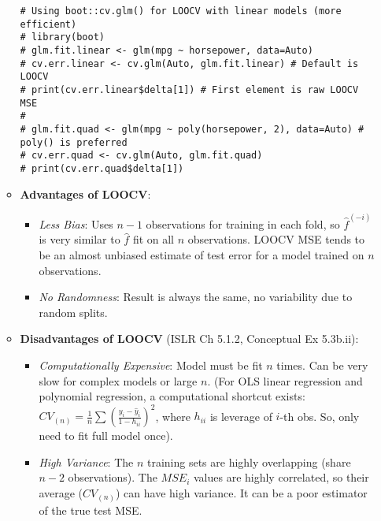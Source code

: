 \documentclass[12pt,a4paper]{article}
\begin{document}
\begin{itemize}
\begin{itemize}
\begin{lstlisting}[caption={LOOCV for Auto Data (Conceptual from Slide L5 p.23)}]
# Using boot::cv.glm() for LOOCV with linear models (more efficient)
# library(boot)
# glm.fit.linear <- glm(mpg ~ horsepower, data=Auto)
# cv.err.linear <- cv.glm(Auto, glm.fit.linear) # Default is LOOCV
# print(cv.err.linear$delta[1]) # First element is raw LOOCV MSE
# 
# glm.fit.quad <- glm(mpg ~ poly(horsepower, 2), data=Auto) # poly() is preferred
# cv.err.quad <- cv.glm(Auto, glm.fit.quad)
# print(cv.err.quad$delta[1])
\end{lstlisting}
            \item \textbf{Advantages of LOOCV}:
                \begin{itemize}
                    \item \textit{Less Bias}: Uses $n-1$ observations for training in each fold, so $\hat{f}^{(-i)}$ is very similar to $\hat{f}$ fit on all $n$ observations. LOOCV MSE tends to be an almost unbiased estimate of test error for a model trained on $n$ observations.
                    \item \textit{No Randomness}: Result is always the same, no variability due to random splits.
                \end{itemize}
            \item \textbf{Disadvantages of LOOCV} (ISLR Ch 5.1.2, Conceptual Ex 5.3b.ii):
                \begin{itemize}
                    \item \textit{Computationally Expensive}: Model must be fit $n$ times. Can be very slow for complex models or large $n$.
                        (For OLS linear regression and polynomial regression, a computational shortcut exists: $CV_{(n)} = \frac{1}{n} \sum (\frac{y_i - \hat{y}_i}{1-h_{ii}})^2$, where $h_{ii}$ is leverage of $i$-th obs. So, only need to fit full model once).
                    \item \textit{High Variance}: The $n$ training sets are highly overlapping (share $n-2$ observations). The $MSE_i$ values are highly correlated, so their average ($CV_{(n)}$) can have high variance. It can be a poor estimator of the true test MSE.
                \end{itemize}
        \end{itemize}


\end{itemize}
\end{document}
